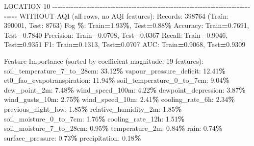 \documentclass[
  letterpaper,
  DIV=11,
  numbers=noendperiod]{scrartcl}
\newenvironment{Shaded}{\begin{snugshade}}{\end{snugshade}}
\newcommand{\BuiltInTok}[1]{#1}
\newcommand{\DecValTok}[1]{\textcolor[rgb]{0.00,0.00,0.81}{#1}}
\newcommand{\FloatTok}[1]{\textcolor[rgb]{0.00,0.00,0.81}{#1}}
\newcommand{\NormalTok}[1]{#1}
\newcommand{\OperatorTok}[1]{\textcolor[rgb]{0.81,0.36,0.00}{\textbf{#1}}}
\begin{document}
\begin{Shaded}
\begin{Highlighting}[]
\NormalTok{LOCATION }\DecValTok{10}
\OperatorTok{{-}{-}{-}{-}{-}{-}{-}{-}{-}{-}{-}{-}{-}{-}{-}{-}{-}{-}{-}{-}{-}{-}{-}{-}{-}{-}{-}{-}{-}{-}{-}{-}{-}{-}{-}{-}{-}{-}{-}{-}{-}{-}{-}{-}{-}{-}{-}{-}{-}{-}{-}{-}{-}{-}{-}{-}{-}{-}{-}{-}{-}{-}{-}{-}{-}{-}{-}{-}{-}{-}{-}{-}{-}{-}{-}{-}{-}{-}{-}{-}}
\NormalTok{WITHOUT AQI (}\BuiltInTok{all}\NormalTok{ rows, no AQI features):}
\NormalTok{  Records: }\DecValTok{398764}\NormalTok{ (Train: }\DecValTok{390001}\NormalTok{, Test: }\DecValTok{8763}\NormalTok{)}
\NormalTok{  Fog }\OperatorTok{\%}\NormalTok{: Train}\OperatorTok{=}\FloatTok{1.93}\OperatorTok{\%}\NormalTok{, Test}\OperatorTok{=}\FloatTok{0.88}\OperatorTok{\%}
\NormalTok{  Accuracy: Train}\OperatorTok{=}\FloatTok{0.7691}\NormalTok{, Test}\OperatorTok{=}\FloatTok{0.7840}
\NormalTok{  Precision: Train}\OperatorTok{=}\FloatTok{0.0708}\NormalTok{, Test}\OperatorTok{=}\FloatTok{0.0367}
\NormalTok{  Recall: Train}\OperatorTok{=}\FloatTok{0.9046}\NormalTok{, Test}\OperatorTok{=}\FloatTok{0.9351}
\NormalTok{  F1: Train}\OperatorTok{=}\FloatTok{0.1313}\NormalTok{, Test}\OperatorTok{=}\FloatTok{0.0707}
\NormalTok{  AUC: Train}\OperatorTok{=}\FloatTok{0.9068}\NormalTok{, Test}\OperatorTok{=}\FloatTok{0.9309}

\NormalTok{  Feature Importance (}\BuiltInTok{sorted}\NormalTok{ by coefficient magnitude, }\DecValTok{19}\NormalTok{ features):}
\NormalTok{    soil\_temperature\_7\_to\_28cm: }\FloatTok{33.12}\OperatorTok{\%}
\NormalTok{    vapour\_pressure\_deficit: }\FloatTok{12.41}\OperatorTok{\%}
\NormalTok{    et0\_fao\_evapotranspiration: }\FloatTok{11.94}\OperatorTok{\%}
\NormalTok{    soil\_temperature\_0\_to\_7cm: }\FloatTok{9.04}\OperatorTok{\%}
\NormalTok{    dew\_point\_2m: }\FloatTok{7.48}\OperatorTok{\%}
\NormalTok{    wind\_speed\_100m: }\FloatTok{4.22}\OperatorTok{\%}
\NormalTok{    dewpoint\_depression: }\FloatTok{3.87}\OperatorTok{\%}
\NormalTok{    wind\_gusts\_10m: }\FloatTok{2.75}\OperatorTok{\%}
\NormalTok{    wind\_speed\_10m: }\FloatTok{2.41}\OperatorTok{\%}
\NormalTok{    cooling\_rate\_6h: }\FloatTok{2.34}\OperatorTok{\%}
\NormalTok{    previous\_night\_low: }\FloatTok{1.85}\OperatorTok{\%}
\NormalTok{    relative\_humidity\_2m: }\FloatTok{1.85}\OperatorTok{\%}
\NormalTok{    soil\_moisture\_0\_to\_7cm: }\FloatTok{1.76}\OperatorTok{\%}
\NormalTok{    cooling\_rate\_12h: }\FloatTok{1.51}\OperatorTok{\%}
\NormalTok{    soil\_moisture\_7\_to\_28cm: }\FloatTok{0.95}\OperatorTok{\%}
\NormalTok{    temperature\_2m: }\FloatTok{0.84}\OperatorTok{\%}
\NormalTok{    rain: }\FloatTok{0.74}\OperatorTok{\%}
\NormalTok{    surface\_pressure: }\FloatTok{0.73}\OperatorTok{\%}
\NormalTok{    precipitation: }\FloatTok{0.18}\OperatorTok{\%}


\end{Highlighting}
\end{Shaded}
\end{document}
